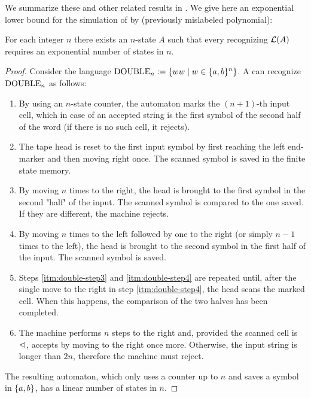 We summarize these and other related results in .
We give here an exponential lower bound for the simulation of \OMODLA by \ONFA (previously mislabeled polynomial):
\begin{thrm}\label{thm:OM1DLAto1NFAlower}
	For each integer $n$ there exists an $n$-state \OMODLA $A$ such that every \ONFA recognizing $\mathcal L(A)$ requires an exponential number of states in $n$.
\end{thrm}
\begin{proof}
	Consider the language $\mathrm{DOUBLE}_n:=\{ww\mid w\in\{a,b\}^n\}$.
	A \OMODLA can recognize $\mathrm{DOUBLE}_n$ as follows:
	\begin{enumerate}
		\item By using an $n$-state counter, the automaton marks the $(n+1)$-th input cell, which in case of an accepted string is the first symbol of the second half of the word (if there is no such cell, it rejects).
		\item The tape head is reset to the first input symbol by first reaching the left end-marker and then moving right once. The scanned symbol is saved in the finite state memory.
		\item\label{itm:double-step3} By moving $n$ times to the right, the head is brought to the first symbol in the second "half" of the input. The scanned symbol is compared to the one saved.
		      If they are different, the machine rejects.
		\item\label{itm:double-step4} By moving $n$ times to the left followed by one to the right (or simply $n-1$ times to the left), the head is brought to the second symbol in the first half of the input. The scanned symbol is saved.
		\item Steps \ref{itm:double-step3} and \ref{itm:double-step4} are repeated until, after the single move to the right in step \ref{itm:double-step4}, the head scans the marked cell. When this happens, the comparison of the two halves has been completed.
		\item The machine performs $n$ steps to the right and, provided the scanned cell is $\lhd$, accepts by moving to the right once more.
		      Otherwise, the input string is longer than $2n$, therefore the machine must reject.
	\end{enumerate}
	The resulting automaton, which only uses a counter up to $n$ and saves a symbol in $\{a,b\}$, has a linear number of states in $n$.


\end{proof}
